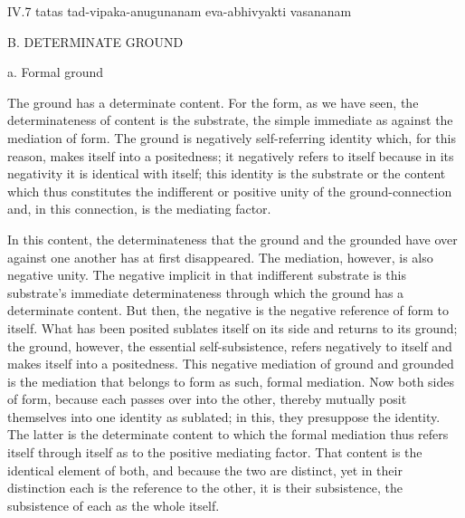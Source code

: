 IV.7
tatas tad-vipaka-anugunanam eva-abhivyakti vasananam

B. DETERMINATE GROUND

a. Formal ground

The ground has a determinate content.
For the form, as we have seen,
the determinateness of content is the substrate,
the simple immediate as against the mediation of form.
The ground is negatively self-referring identity which,
for this reason, makes itself into a positedness;
it negatively refers to itself because in its negativity
it is identical with itself;
this identity is the substrate or the content
which thus constitutes the indifferent
or positive unity of the ground-connection
and, in this connection, is the mediating factor.

In this content, the determinateness that
the ground and the grounded have over
against one another has at first disappeared.
The mediation, however, is also negative unity.
The negative implicit in that indifferent substrate is
this substrate's immediate determinateness through which
the ground has a determinate content.
But then, the negative is the negative reference of form to itself.
What has been posited sublates itself on its side
and returns to its ground;
the ground, however, the essential self-subsistence,
refers negatively to itself and makes itself into a positedness.
This negative mediation of ground and grounded is
the mediation that belongs to form as such, formal mediation.
Now both sides of form, because each passes over into the other,
thereby mutually posit themselves into one identity as sublated;
in this, they presuppose the identity.
The latter is the determinate content
to which the formal mediation thus refers itself
through itself as to the positive mediating factor.
That content is the identical element of both,
and because the two are distinct,
yet in their distinction each is
the reference to the other,
it is their subsistence,
the subsistence of each as the whole itself.

